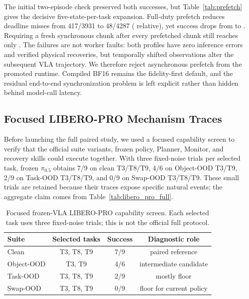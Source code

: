 \documentclass[runningheads]{waica}
\newcommand{\pizero}{$\pi_{0.5}$}
\begin{document}
The initial two-episode check preserved both successes, but
Table~\ref{tab:prefetch} gives the decisive five-state-per-task expansion.
Full-duty prefetch reduces deadline misses from 417/3931 to 48/4287
(\CarveRealtimeMissReduction{} relative), yet success drops from
\CarveSyncEightSuccess{} to \CarveAsyncSuccess{}. Requiring a fresh synchronous
chunk after every prefetched chunk still reaches only
\CarveAsyncIntervalSuccess{}. The failures are not worker faults: both profiles
have zero inference errors and verified physical recoveries, but temporally
shifted observations alter the subsequent VLA trajectory. We therefore reject
asynchronous prefetch from the promoted runtime. Compiled BF16 remains the
fidelity-first default, and the residual end-to-end synchronization problem is
left explicit rather than hidden behind model-call latency.



\subsection{Focused LIBERO-PRO Mechanism Traces}
\label{sec:pro}

Before launching the full paired study, we used a focused capability screen to
verify that the official suite variants, frozen policy, Planner, Monitor, and
recovery skills could execute together. With three fixed-noise trials per
selected task, frozen \pizero{} obtains 7/9 on clean T3/T8/T9, 4/6 on
Object-OOD T3/T9, 2/9 on Task-OOD T3/T8/T9, and 0/9 on Swap-OOD T3/T8/T9.
These small trials are retained because their traces expose specific natural
events; the aggregate claim comes from Table~\ref{tab:libero_pro_full}.

\begin{table}
\caption{Focused frozen-VLA LIBERO-PRO capability screen. Each selected task
uses three fixed-noise trials; this is not the official full protocol.}
\label{tab:pro_screen}
\centering
\small
\begin{tabular}{lccc}
\toprule
Suite & Selected tasks & Success & Diagnostic role \\
\midrule
Clean & T3, T8, T9 & 7/9 & paired reference \\
Object-OOD & T3, T9 & 4/6 & intermediate candidate \\
Task-OOD & T3, T8, T9 & 2/9 & mostly floor \\
Swap-OOD & T3, T8, T9 & 0/9 & floor for current policy \\
\bottomrule
\end{tabular}
\end{table}
\end{document}

